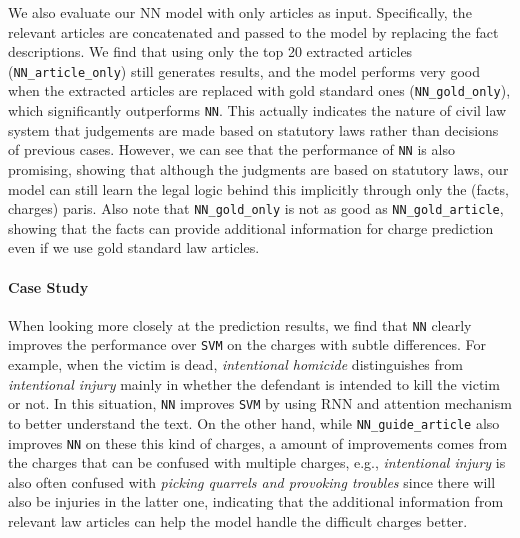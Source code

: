 We also evaluate our NN model with only articles as input. Specifically, the relevant articles are concatenated and passed to the model by replacing the fact descriptions. We find that using only the top 20 extracted articles (\texttt{NN\_article\_only}) still generates  results, and the model performs very good when the extracted articles are replaced with gold standard ones (\texttt{NN\_gold\_only}), which significantly outperforms \texttt{NN}. 
This actually indicates the nature of civil law system that judgements are made based on statutory laws rather than decisions of previous cases.
However, we can see that the performance of \texttt{NN} is also promising, showing that although the judgments are based on statutory laws, our model can still learn the legal logic behind this implicitly through only the (facts, charges) paris. 
Also note that \texttt{NN\_gold\_only} is not as good as \texttt{NN\_gold\_article}, showing that the facts can provide additional information for charge prediction even if we use gold standard law articles.


\paragraph{Case Study}
When looking more closely at the prediction results, we find that \texttt{NN} clearly improves the performance over \texttt{SVM} on the charges with subtle differences. For example, when the victim is dead, \emph{intentional homicide} distinguishes from \emph{intentional injury} mainly in whether the defendant is intended to kill the victim or not. In this situation, \texttt{NN} improves \texttt{SVM} by using RNN and attention mechanism to better understand the text. 
On the other hand, while \texttt{NN\_guide\_article} also improves \texttt{NN} on these this kind of charges, a  amount of improvements comes from the charges that can be confused with multiple charges, e.g., \emph{intentional injury} is also often confused with \emph{picking quarrels and provoking troubles} since there will also be injuries in the latter one, indicating that the additional information from relevant law articles can help the model handle the difficult charges better.


